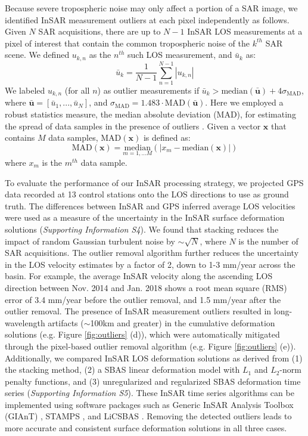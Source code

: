 \documentclass{utexasthesis}
\begin{document}
Because severe tropospheric noise may only affect a portion of a SAR image, we identified InSAR measurement outliers at each pixel independently as follows. Given $N$ SAR acquisitions, there are up to $N-1$ InSAR LOS measurements at a pixel of interest that contain the common tropospheric noise of the $k^{th}$ SAR scene. We defined $u_{k,n}$ as the $n^{th}$ such LOS measurement, and $\bar{u}_k$ as:
\begin{equation}
	\bar{u}_k  = \frac{1}{N-1} \sum_{n=1}^{N-1} |u_{k,n}|  
\end{equation}
We labeled $u_{k,n}$ (for all $n$) as outlier measurements if $\bar{u}_k > \mathrm{median}(\mathbf{\bar{u}}) + 4 \sigma_{\mathrm{MAD}}$, where $\mathbf{\bar{u}}=[\bar{u}_1,...,\bar{u}_N]$, and $\sigma_{\mathrm{MAD}}=1.483 \cdot \mathrm{MAD}(\mathbf{\bar{u}})$. Here we employed a robust statistics measure, the median absolute deviation (MAD), for estimating the spread of data samples in the presence of outliers \cite{Hampel1974, Rousseeuw2011}. Given a vector $\mathbf{x}$ that contains $M$ data samples, $\mathrm{MAD}(\mathbf{x})$ is defined as:
\begin{equation}
	\mathrm{MAD}(\mathbf{x}) =  \underset{m = 1,\ldots M}{\mathrm{median}} \left( \bigr\lvert  x_m - \mathrm{median}(\mathbf{x})  \bigr\rvert \right)
\end{equation}
where $x_m$ is the $m^{th}$ data sample. 

To evaluate the performance of our InSAR processing strategy, we projected GPS data recorded at 13 control stations onto the LOS directions to use as ground truth. The differences between InSAR and GPS inferred average LOS velocities were used as a measure of the uncertainty in the InSAR surface deformation solutions (\textit{Supporting Information S4}). We found that stacking reduces the impact of random Gaussian turbulent noise by $ \sim \sqrt{N} $, where $ N $ is the number of SAR acquisitions. The outlier removal algorithm further reduces the uncertainty in the LOS velocity estimates by a factor of 2, down to 1-3 mm/year across the basin. For example, the average InSAR velocity along the ascending LOS direction between Nov. 2014 and Jan. 2018 shows a root mean square (RMS) error of 3.4 mm/year before the outlier removal, and 1.5 mm/year after the outlier removal. The presence of InSAR measurement outliers resulted in long-wavelength artifacts ($ \sim $100km and greater) in the cumulative deformation solutions (e.g. Figure \ref{fig:outliers} (d)), which were automatically mitigated through the pixel-based outlier removal algorithm (e.g. Figure \ref{fig:outliers} (e)). Additionally, we compared InSAR LOS deformation solutions as derived from (1) the stacking method, (2) a SBAS linear deformation model with $L_1$ and $L_2$-norm penalty functions, and (3) unregularized and regularized SBAS deformation time series (\textit{Supporting Information S5}). These InSAR time series algorithms can be implemented using software packages such as Generic InSAR Analysis Toolbox (GIAnT) \cite{agram2013new}, STAMPS \cite{hooper2012recent}, and LiCSBAS \cite{morishita2020licsbas}. Removing the detected outliers leads to more accurate and consistent surface deformation solutions in all three cases.
\end{document}
